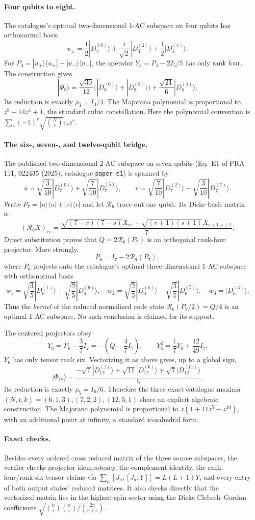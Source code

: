 \documentclass[11pt]{article}
\newcommand{\D}[2]{|D_{#1}^{(#2)}\rangle}
\begin{document}
\paragraph{Four qubits to eight.}
The catalogue's optimal two-dimensional 1-AC subspace on four qubits has
orthonormal basis
\[
u_\pm=\frac12\D4{0}\pm\frac{i}{\sqrt2}\D4{2}+\frac12\D4{4}.
\]
For $P_4=|u_+\rangle\langle u_+|+|u_-\rangle\langle u_-|$, the operator
$Y_4=P_4-2I_5/5$ has only rank four. The construction gives
\[
\boxed{|\Phi_8\rangle=
\frac{\sqrt{30}}{12}\bigl(\D8{0}+\D8{8}\bigr)
+\frac{\sqrt{21}}6\D8{4}.}
\]
Its reduction is exactly $\rho_3=I_4/4$. The Majorana polynomial is
proportional to $z^8+14z^4+1$, the standard cubic constellation. Here the
polynomial convention is $\sum_r(-1)^r\sqrt{\binom Nr}c_rz^r$.

\paragraph{The six-, seven-, and twelve-qubit bridge.}
The published two-dimensional 2-AC subspace on seven qubits (Eq.~E1 of
PRA 111, 022435 (2025), catalogue \texttt{paper-e1}) is spanned by
\[
u=\sqrt{\frac3{10}}\D7{0}+\sqrt{\frac7{10}}\D7{5},\qquad
v=\sqrt{\frac7{10}}\D7{2}-\sqrt{\frac3{10}}\D7{7}.
\]
Write $P_7=|u\rangle\langle u|+|v\rangle\langle v|$ and let $\mathcal R_6$
trace out one qubit. Its Dicke-basis matrix is
\[
(\mathcal R_6 X)_{rs}=
\frac{\sqrt{(7-r)(7-s)}X_{rs}
+\sqrt{(r+1)(s+1)}X_{r+1,s+1}}7.
\]
Direct substitution proves that $Q=2\mathcal R_6(P_7)$ is an orthogonal
rank-four projector. More strongly,
\[
\boxed{P_6=I_7-2\mathcal R_6(P_7),}
\]
where $P_6$ projects onto the catalogue's optimal three-dimensional 1-AC
subspace with orthonormal basis
\[
w_1=\sqrt{\frac35}\D6{1}+\sqrt{\frac25}\D6{6},\quad
w_2=\sqrt{\frac25}\D6{0}-\sqrt{\frac35}\D6{5},\quad
w_3=\D6{3}.
\]
Thus the \emph{kernel} of the reduced normalized code state
$\mathcal R_6(P_7/2)=Q/4$ is an optimal 1-AC subspace. No such conclusion
is claimed for its support.

The centered projectors obey
\[
Y_6=P_6-\frac37I_7=-\left(Q-\frac47I_7\right),
\qquad Y_6^2=\frac17Y_6+\frac{12}{49}I_7.
\]
$Y_6$ has only tensor rank six. Vectorizing it as above gives, up to a
global sign,
\[
\boxed{|\Phi_{12}\rangle=
\frac{-\sqrt7\D{12}{1}+\sqrt{11}\D{12}{6}
+\sqrt7\D{12}{11}}5.}
\]
Its reduction is exactly $\rho_5=I_6/6$. Therefore the three exact catalogue
maxima $(N,t,k)=(6,1,3),(7,2,2),(12,5,1)$ share an explicit algebraic
construction. The Majorana polynomial is proportional to
$z(1+11z^5-z^{10})$, with an additional point at infinity, a standard
icosahedral form.

\paragraph{Exact checks.}
Besides every ordered cross reduced matrix of the three source subspaces,
the verifier checks projector idempotency, the complement identity, the
rank-four/rank-six tensor claims via
$\sum_a[J_a,[J_a,Y]]=L(L+1)Y$, and every entry of both output states'
reduced matrices. It also checks directly that the vectorized matrix lies
in the highest-spin sector using the Dicke Clebsch--Gordan coefficients
$\sqrt{\binom nr\binom ns/\binom{2n}{r+s}}$.
\end{document}
